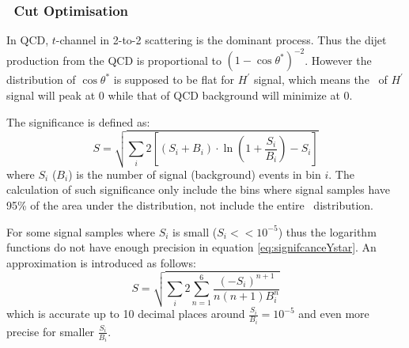 \subsubsection{\ystar\ Cut Optimisation}
\label{section:ystarCutOptimization}


In QCD, $t$-channel in 2-to-2 scattering is the dominant process. Thus the dijet production from the QCD is proportional to $\displaystyle{(1-\cos\theta^{*})^{-2}}$. However the distribution of $\cos\theta^{*}$ is supposed to be flat for $H^\prime$ signal, which means the \ystar\ of $H^\prime$ signal will peak at 0 while that of QCD background will minimize at 0.


The significance is defined as: 
\begin{equation}
\label{eq:signifcanceYstar} %
S  = \sqrt{\sum_{i}{2\left[ \left(S_{i}+B_{i} \right)\cdot \ln \left(1+\frac{S_{i}}{B_{i}}\right)-S_{i}\right]}}
\end{equation}
where $S_i$ ($B_i$) is the number of signal (background) events in bin $i$. 
The calculation of such significance only include the bins where signal samples have 95\% of the area under the distribution, not include the entire \mjj\ distribution.

For some signal samples where $S_i$ is small ($S_i << 10^{-5}$) thus the logarithm functions do not have
enough precision in equation \ref{eq:signifcanceYstar}. An approximation is introduced as follows:
\begin{equation}
S = \sqrt{\sum_{i}{2\sum_{n=1}^{6}{\frac{(-S_i)^{n+1}}{n \left(n+1 \right) B_i^n}}}}
\end{equation}
which is accurate up to 10 decimal places around $\frac{S_i}{B_i} = 10^{-5}$ and even more precise for smaller $\frac{S_i}{B_i}$.

